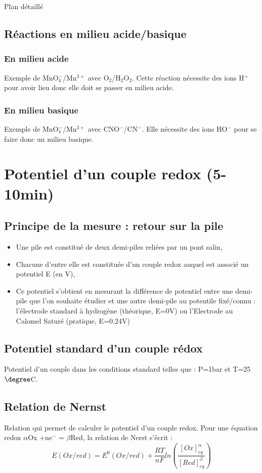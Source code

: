 \begin{reportBlock}{Plan détaillé}
\subsection{Réactions en milieu acide/basique}
\subsubsection{En milieu acide}
Exemple de MnO$_4^-$/Mn$^{3+}$ avec O$_2$/H$_2$O$_2$. Cette réaction  nécessite des ions H$^+$ pour avoir lieu donc elle doit se passer en milieu acide.
\subsubsection{En milieu basique}
Exemple de MnO$_4^-$/Mn$^{3+}$ avec CNO$^-$/CN$^-$. Elle nécessite des ions HO$^-$ pour se faire donc un milieu basique.

\section{Potentiel d'un couple redox (5-10min)}
\subsection{Principe de la mesure : retour sur la pile}
\begin{itemize}
    \item Une pile est constitué de deux demi-piles reliées par un pont salin,
    \item Chacune d'entre elle est constituée d'un couple redox auquel est associé un potentiel E (en V),
    \item Ce potentiel s'obtient en mesurant la différence de potentiel entre une demi-pile que l'on souhaite étudier et une autre demi-pile au potentile fixé/connu : l'électrode standard à hydrogène (théorique, E=0V) ou l'Electrode au Calomel Saturé (pratique, E=0.24V)
\end{itemize}
\subsection{Potentiel standard d'un couple rédox}
Potentiel d'un couple dans les conditions standard telles que : P=1bar et T=25$\degree$C.
\subsection{Relation de Nernst}
Relation qui permet de calculer le potentiel d'un couple redox. Pour une équation redox $\alpha$Ox +ne$^-$ = $\beta$Red, la relation de Nerst s'écrit :
\begin{equation}
    E(Ox/red) = E^0(Ox/red) + \frac{RT}{nF}ln\left( \frac{[Ox]_{eq}^\alpha}{[Red]_{eq}^\beta}\right)
\end{equation}


\end{reportBlock}
